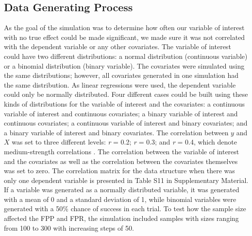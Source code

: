 \subsection{Data Generating Process}
As the goal of the simulation was to determine how often our variable of interest with no true effect could be made significant, we made sure it was not correlated with the dependent variable or any other covariates. The variable of interest could have two different distributions: a normal distribution (continuous variable) or a binomial distribution (binary variable). The covariates were simulated using the same distributions; however, all covariates generated in one simulation had the same distribution. As linear regressions were used, the dependent variable could only be normally distributed. Four different cases could be built using these kinds of distributions for the variable of interest and the covariates: a continuous variable of interest and continuous covariates; a binary variable of interest and continuous covariates; a continuous variable of interest and binary covariates; and a binary variable of interest and binary covariates. 
The correlation between $y$ and $X$ was set to three different levels: \textit{r} = 0.2; \textit{r} = 0.3; and \textit{r} = 0.4, which denote medium-strength correlations \citep{Cohen1989}. The correlation between the variable of interest and the covariates as well as the correlation between the covariates themselves was set to zero. The correlation matrix for the data structure when there was only one dependent variable is presented in Table S11 in Supplementary Material. If a variable was generated as a normally distributed variable, it was generated with a mean of 0 and a standard deviation of 1, while binomial variables were generated with a 50\% chance of success in each trial. To test how the sample size affected the FPP and FPR, the simulation included samples with sizes ranging from 100 to 300 with increasing steps of 50. 

